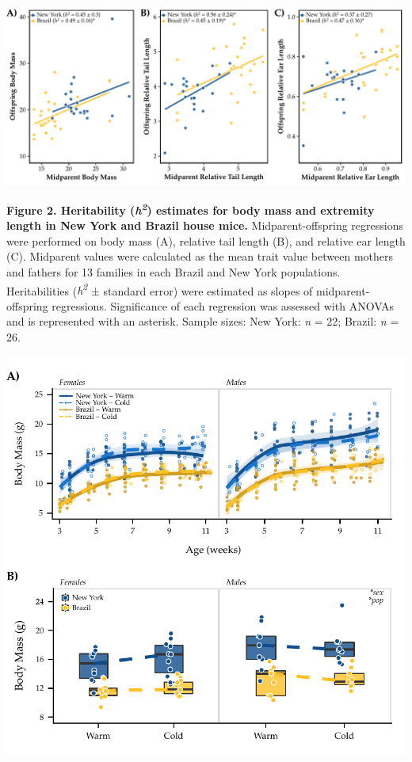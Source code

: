 \documentclass[
]{article}
\begin{document}
\newpage

\includegraphics{../results/figures/N2N3_h2.pdf}

\textbf{Figure 2. Heritability (\emph{h\textsuperscript{2}}) estimates
for body mass and extremity length in New York and Brazil house mice.}
Midparent-offspring regressions were performed on body mass (A),
relative tail length (B), and relative ear length (C). Midparent values
were calculated as the mean trait value between mothers and fathers for
13 families in each Brazil and New York populations. Heritabilities
(\emph{h\textsuperscript{2}} ± standard error) were estimated as slopes
of midparent-offspring regressions. Significance of each regression was
assessed with ANOVAs and is represented with an asterisk. Sample sizes:
New York: \emph{n} = 22; Brazil: \emph{n} = 26.

\newpage

\includegraphics{../results/figures/Weekly_RXN_BW.pdf}
\end{document}
